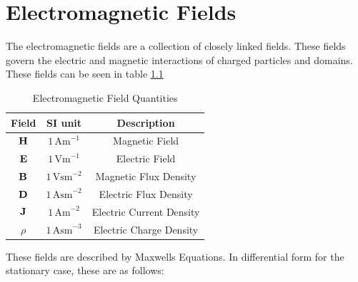 \chapter{Electromagnetic Fields}
The electromagnetic fields are a collection of closely linked fields.
These fields govern the electric and magnetic interactions of charged
particles and domains. These fields can be seen in table \ref{tab:fields}

\begin{table}[h!]
    \begin{center}
        \begin{tabular}{c c c}
            Field    & SI unit                & Description              \\
            \hline
            $\vb{H}$ & $1\, \text{Am}^{-1} $  & Magnetic Field           \\
            $\vb{E}$ & $1\, \text{Vm}^{-1} $  & Electric Field           \\
            $\vb{B}$ & $1\, \text{Vsm}^{-2} $ & Magnetic Flux Density    \\
            $\vb{D}$ & $1\, \text{Asm}^{-2} $ & Electric Flux Density    \\
            $\vb{J}$ & $1\, \text{Am}^{-2} $  & Electric Current Density \\
            $\rho$   & $1\, \text{Asm}^{-3} $ & Electric Charge Density
        \end{tabular}
        \caption{Electromagnetic Field Quantities}
        \label{tab:fields}
    \end{center}
\end{table}
These fields are described by Maxwells Equations.
In differential form for the stationary case, these are as follows:

